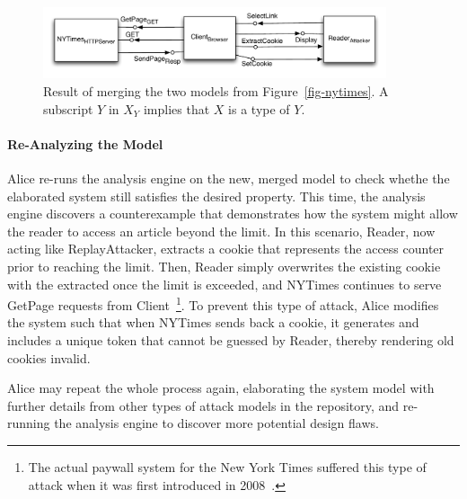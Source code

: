 \begin{figure}[!t]
\centering
\includegraphics[width=0.9\textwidth]{diagrams/merged}
\caption{Result of merging the two models from
  Figure~\ref{fig-nytimes}. A subscript $Y$ in $X_{Y}$ implies that
  $X$ is a type of $Y$.}
\label{fig-merged}
\end{figure}

\paragraph{\textbf{Re-Analyzing the Model}}

Alice re-runs the analysis engine on the new, merged model to check
whethe the elaborated system still satisfies the desired
property. This time, the analysis engine discovers a counterexample
that demonstrates how the system might allow the reader to access an
article beyond the limit. In this scenario, \textsf{Reader}, now
acting like \textsf{ReplayAttacker}, extracts a cookie that represents
the access counter prior to reaching the limit. Then, \textsf{Reader}
simply overwrites the existing cookie with the extracted once the
limit is exceeded, and \textsf{NYTimes} continues to serve
\textsf{GetPage} requests from \textsf{Client}~\footnote{The actual
  paywall system for the New York Times suffered this type of attack
  when it was first introduced in 2008~\cite{nytimes-attack}.}. To
prevent this type of attack, Alice modifies the system such that when
\textsf{NYTimes} sends back a cookie, it generates and includes a
unique token that cannot be guessed by \textsf{Reader}, thereby
rendering old cookies invalid.

Alice may repeat the whole process again, elaborating the system model
with further details from other types of attack models in the
repository, and re-running the analysis engine to discover more
potential design flaws.
